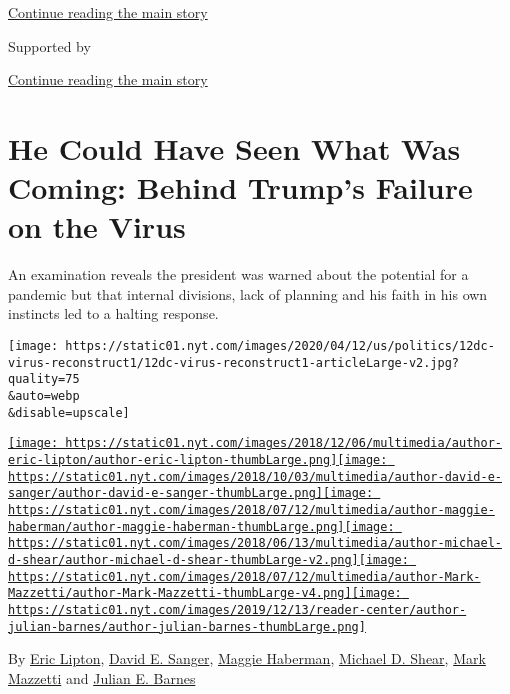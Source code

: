 \protect\hyperlink{after-top}{Continue reading the main story}

Supported by

\protect\hyperlink{after-sponsor}{Continue reading the main story}

\hypertarget{he-could-have-seen-what-was-coming-behind-trumps-failure-on-the-virus}{%
\section{He Could Have Seen What Was Coming: Behind Trump's Failure on
the
Virus}\label{he-could-have-seen-what-was-coming-behind-trumps-failure-on-the-virus}}

An examination reveals the president was warned about the potential for
a pandemic but that internal divisions, lack of planning and his faith
in his own instincts led to a halting response.

\texttt{[image: https://static01.nyt.com/images/2020/04/12/us/politics/12dc-virus-reconstruct1/12dc-virus-reconstruct1-articleLarge-v2.jpg?quality=75\\\&auto=webp\\\&disable=upscale]}

\href{https://www.nytimes.com/by/eric-lipton}{\texttt{[image: https://static01.nyt.com/images/2018/12/06/multimedia/author-eric-lipton/author-eric-lipton-thumbLarge.png]}}\href{https://www.nytimes.com/by/david-e-sanger}{\texttt{[image: https://static01.nyt.com/images/2018/10/03/multimedia/author-david-e-sanger/author-david-e-sanger-thumbLarge.png]}}\href{https://www.nytimes.com/by/maggie-haberman}{\texttt{[image: https://static01.nyt.com/images/2018/07/12/multimedia/author-maggie-haberman/author-maggie-haberman-thumbLarge.png]}}\href{https://www.nytimes.com/by/michael-d-shear}{\texttt{[image: https://static01.nyt.com/images/2018/06/13/multimedia/author-michael-d-shear/author-michael-d-shear-thumbLarge-v2.png]}}\href{https://www.nytimes.com/by/mark-mazzetti}{\texttt{[image: https://static01.nyt.com/images/2018/07/12/multimedia/author-Mark-Mazzetti/author-Mark-Mazzetti-thumbLarge-v4.png]}}\href{https://www.nytimes.com/by/julian-e-barnes}{\texttt{[image: https://static01.nyt.com/images/2019/12/13/reader-center/author-julian-barnes/author-julian-barnes-thumbLarge.png]}}

By \href{https://www.nytimes.com/by/eric-lipton}{Eric Lipton},
\href{https://www.nytimes.com/by/david-e-sanger}{David E. Sanger},
\href{https://www.nytimes.com/by/maggie-haberman}{Maggie Haberman},
\href{https://www.nytimes.com/by/michael-d-shear}{Michael D. Shear},
\href{https://www.nytimes.com/by/mark-mazzetti}{Mark Mazzetti} and
\href{https://www.nytimes.com/by/julian-e-barnes}{Julian E. Barnes}

